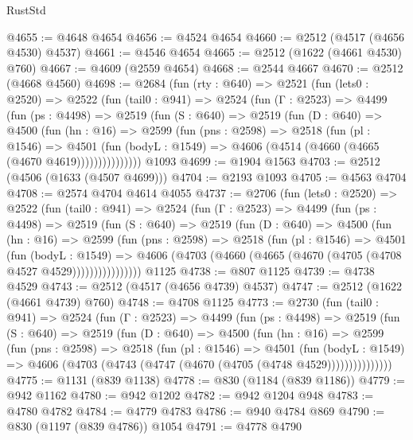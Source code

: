 \begin{lexlean}{RustStd}
\begin{coremodule}
@4655 := @4648 @4654
@4656 := @4524 @4654
@4660 := @2512 (@4517 (@4656 @4530) @4537)
@4661 := @4546 @4654
@4665 := @2512 (@1622 (@4661 @4530) @760)
@4667 := @4609 (@2559 @4654)
@4668 := @2544 @4667
@4670 := @2512 (@4668 @4560)
@4698 := @2684
    (fun (rty : @640) =>
    @2521
      (fun (lets0 : @2520) =>
      @2522
        (fun (tail0 : @941) =>
        @2524
          (fun (Γ : @2523) =>
          @4499
            (fun (ps : @4498) =>
            @2519
              (fun (S : @640) =>
              @2519
                (fun (D : @640) =>
                @4500
                  (fun (hn : @16) =>
                  @2599
                    (fun (pns : @2598) =>
                    @2518
                      (fun (pl : @1546) =>
                      @4501
                        (fun (bodyL : @1549) =>
                        @4606 (@4514 (@4660 (@4665 (@4670 @4619)))))))))))))))
    @1093
@4699 := @1904 @1563
@4703 := @2512 (@4506 (@1633 (@4507 @4699)))
@4704 := @2193 @1093
@4705 := @4563 @4704
@4708 := @2574 @4704 @4614 @4055
@4737 := @2706
    (fun (lets0 : @2520) =>
    @2522
      (fun (tail0 : @941) =>
      @2524
        (fun (Γ : @2523) =>
        @4499
          (fun (ps : @4498) =>
          @2519
            (fun (S : @640) =>
            @2519
              (fun (D : @640) =>
              @4500
                (fun (hn : @16) =>
                @2599
                  (fun (pns : @2598) =>
                  @2518
                    (fun (pl : @1546) =>
                    @4501
                      (fun (bodyL : @1549) =>
                      @4606 (@4703 (@4660 (@4665 (@4670 (@4705 (@4708 @4527 @4529))))))))))))))))
    @1125
@4738 := @807 @1125
@4739 := @4738 @4529
@4743 := @2512 (@4517 (@4656 @4739) @4537)
@4747 := @2512 (@1622 (@4661 @4739) @760)
@4748 := @4708 @1125
@4773 := @2730
    (fun (tail0 : @941) =>
    @2524
      (fun (Γ : @2523) =>
      @4499
        (fun (ps : @4498) =>
        @2519
          (fun (S : @640) =>
          @2519
            (fun (D : @640) =>
            @4500
              (fun (hn : @16) =>
              @2599
                (fun (pns : @2598) =>
                @2518
                  (fun (pl : @1546) =>
                  @4501
                    (fun (bodyL : @1549) =>
                    @4606 (@4703 (@4743 (@4747 (@4670 (@4705 (@4748 @4529)))))))))))))))
@4775 := @1131 (@839 @1138)
@4778 := @830 (@1184 (@839 @1186))
@4779 := @942 @1162
@4780 := @942 @1202
@4782 := @942 @1204 @948
@4783 := @4780 @4782
@4784 := @4779 @4783
@4786 := @940 @4784 @869
@4790 := @830 (@1197 (@839 @4786)) @1054
@4791 := @4778 @4790

\end{coremodule}
\end{lexlean}
